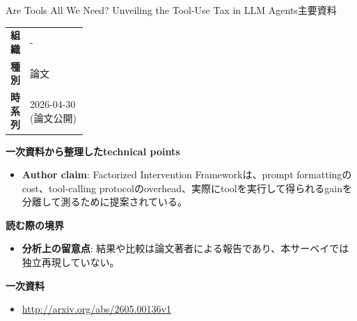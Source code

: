 \begin{technicalnote}{Are Tools All We Need? Unveiling the Tool-Use Tax in LLM Agents}{主要資料}
\begingroup
\begin{tabularx}{\linewidth}{@{}>{\bfseries}p{0.22\linewidth}X@{}}
組織 & - \\
種別 & 論文 \\
時系列 & 2026-04-30 (論文公開) \\
\end{tabularx}
\smallskip
{\bfseries 一次資料から整理したtechnical points}
\begin{itemize}[leftmargin=1.5em,itemsep=0.35em]
\item \textbf{Author claim}: Factorized Intervention Frameworkは、prompt formattingのcost、tool-calling protocolのoverhead、実際にtoolを実行して得られるgainを分離して測るために提案されている。
\end{itemize}
{\bfseries 読む際の境界}
\begin{itemize}[leftmargin=1.5em,itemsep=0.35em]
\item \textbf{分析上の留意点}: 結果や比較は論文著者による報告であり、本サーベイでは独立再現していない。
\end{itemize}
\begin{samepage}
{\bfseries 一次資料}
\begingroup\sloppy
\begin{itemize}[leftmargin=1.5em,itemsep=0.25em]
\item {\scriptsize\url{http://arxiv.org/abs/2605.00136v1}}
\end{itemize}
\endgroup
\end{samepage}
\endgroup
\end{technicalnote}
\medskip
